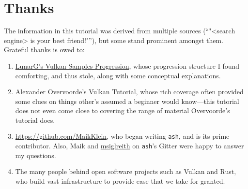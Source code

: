 \documentclass[12pt,letterpaper]{article}
\newcommand{\inquotes}[1]{``#1''}	%
\newcommand{\ash}{\texttt{ash}}
\begin{document}
\section{Thanks}
	The information in this tutorial was derived from multiple sources (\inquotes{"<search engine> is your best friend!"}), but some stand prominent amongst them. Grateful thanks is owed to:
		\begin{enumerate}
			\item \href{https://vulkan.lunarg.com/doc/sdk/1.0.65.1/windows/tutorial/html/index.html}{LunarG's Vulkan Samples Progression}, whose progression structure I found comforting, and thus stole, along with some conceptual explanations. 
			
			\item Alexander Overvoorde's \href{https://vulkan-tutorial.com/}{Vulkan Tutorial}, whose rich coverage often provided some clues on things other's assumed a beginner would know---this tutorial does not even come close to covering the range of material Overvoorde's tutorial does.
			
			\item \href{Maik Klein}{https://github.com/MaikKlein}, who began writing \ash, and is its prime contributor. Also, Maik and \href{https://github.com/msiglreith}{msiglreith} on \ash's Gitter were happy to answer my questions.
			
			\item The many people behind open software projects such as Vulkan and Rust, who build vast infrastructure to provide ease that we take for granted. 
		\end{enumerate}
\printbibliography
\end{document}
